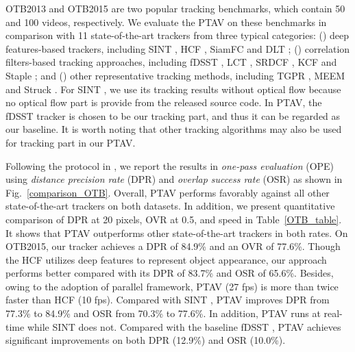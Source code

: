 \documentclass[10pt,twocolumn,letterpaper]{article}
\begin{document}
 OTB2013 \cite{wu2013online} and OTB2015 \cite{wu2015object} are two popular tracking benchmarks, which contain 50 and 100 videos, respectively. We evaluate the PTAV on these benchmarks in comparison with 11 state-of-the-art trackers from three typical categories: (\lowercase\expandafter{}) deep features-based trackers, including SINT \cite{tao2016siamese}, HCF \cite{ma2015hierarchical}, SiamFC \cite{bertinetto2016fully} and DLT \cite{wang2013learning}; (\lowercase\expandafter{}) correlation filters-based tracking approaches, including fDSST \cite{danelljan2016discriminative}, LCT \cite{ma2015long}, SRDCF \cite{danelljan2015learning}, KCF \cite{henriques2015high} and Staple \cite{bertinetto2016staple}; and (\lowercase\expandafter{}) other representative tracking methods, including TGPR \cite{gao2014transfer}, MEEM \cite{zhang2014meem} and Struck \cite{hare2016struck}. For SINT \cite{tao2016siamese}, we use its tracking results without optical flow because no optical flow part is provide from the released source code. In PTAV, the fDSST tracker \cite{danelljan2016discriminative} is chosen to be our tracking part, and thus it can be regarded as our baseline. It is worth noting that other tracking algorithms may also be used for tracking part in our PTAV.

Following the protocol in \cite{wu2013online,wu2015object}, we report the results in \emph{one-pass evaluation} (OPE) using \emph{distance precision rate} (DPR) and \emph{overlap success rate} (OSR) as shown in Fig.~\ref{comparison_OTB}. Overall, PTAV performs favorably against all other state-of-the-art trackers on both datasets. In addition, we present quantitative comparison of DPR at 20 pixels, OVR at 0.5, and speed in Table~\ref{OTB_table}. It shows that PTAV outperforms other state-of-the-art trackers in both rates. On OTB2015, our tracker achieves a DPR of 84.9\% and an OVR of 77.6\%. Though the HCF \cite{ma2015hierarchical} utilizes deep features to represent object appearance, our approach performs better compared with its DPR of 83.7\% and OSR of 65.6\%. Besides, owing to the adoption of parallel framework, PTAV (27 fps) is more than twice faster than HCF (10 fps). Compared with SINT \cite{tao2016siamese}, PTAV improves DPR from 77.3\% to 84.9\% and OSR from 70.3\% to 77.6\%. In addition, PTAV runs at real-time while SINT does not. Compared with the baseline fDSST \cite{danelljan2016discriminative}, PTAV achieves significant improvements on both DPR (12.9\%) and OSR (10.0\%).
\end{document}
